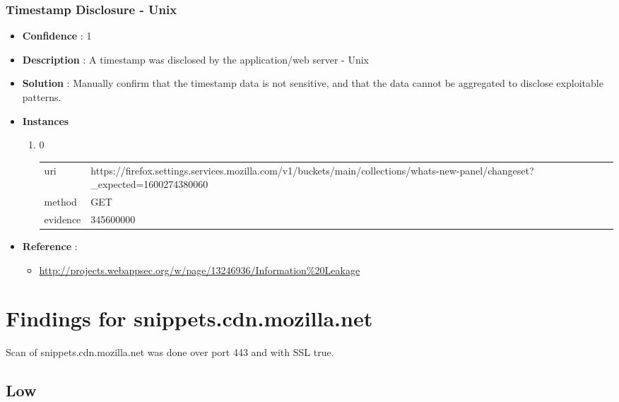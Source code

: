 \documentclass[10pt]{article}
\begin{document}
\subsubsection{Timestamp Disclosure - Unix}
\begin{itemize}
\item[] \textbf{Confidence} : 1
\item[] \textbf{Description} : A timestamp was disclosed by the application/web server - Unix
\item[] \textbf{Solution} :  Manually confirm that the timestamp data is not sensitive, and that the data cannot be aggregated to disclose exploitable patterns.
\item[] \textbf{Instances}
\begin{enumerate}
\item[] 0
\begin{tabular}{| l | p{12cm}}
uri & https://firefox.settings.services.mozilla.com/v1/buckets/main/collections/whats-new-panel/changeset?\_expected=1600274380060 \\
method & GET \\
evidence & 345600000 \\
\end{tabular}
\end{enumerate}
\item[] \textbf{Reference} : 
\begin{itemize}
\item \url{http://projects.webappsec.org/w/page/13246936/Information\%20Leakage}
\end{itemize}
\end{itemize}
\section{Findings for snippets.cdn.mozilla.net}
Scan of snippets.cdn.mozilla.net was done over port 443 and with SSL true.
\subsection{Low}
\end{document}

